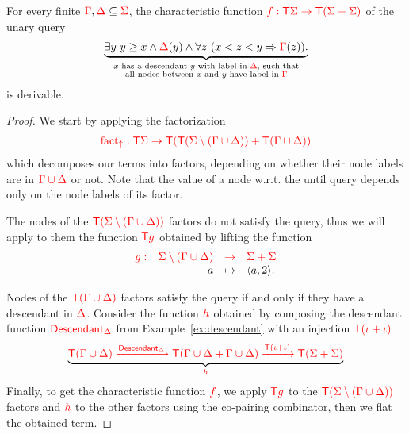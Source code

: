 \medskip
\begin{lemma}\label{lem:untilmod}
For every finite ${\color{red}{\Gamma}}, {\color{red}{\Delta}} \subseteq {\color{red}{\Sigma}}$,  the characteristic function ${\color{red}{f:{\color{red}{\mathsf T}}{\color{red}{\Sigma}}\to{\color{red}{\mathsf T}}({\color{red}{\Sigma}}+{\color{red}{\Sigma}})}}$ of the unary query
         \begin{align*}
              \underbrace{\exists y\ y \geq x \land {\color{red}{\Delta}}(y) \land  \forall z \ (x < z < y \Rightarrow {\color{red}{\Gamma}}(z)).}_{\substack{\text{$x$ has a descendant $y$ with label in ${\color{red}{\Delta}}$, such that}\\ \text{all nodes between $x$ and $y$ have label in ${\color{red}{\Gamma}}$}}} 
              \end{align*}
is derivable.
\end{lemma}
\begin{proof}
We start by applying the factorization
\begin{align*}
{\color{red}{{\color{red}{\mathrm{fact_{\uparrow}}}}: {\color{red}{\mathsf T}}\Sigma \to {\color{red}{\mathsf T}}({\color{red}{\mathsf T}}(\Sigma\setminus(\Gamma\cup\Delta)) +{\color{red}{\mathsf T}}(\Gamma\cup\Delta))}}
\end{align*}
which decomposes our terms into factors, depending on whether their node labels are in ${\color{red}{\Gamma\cup\Delta}}$ or not. 
Note that the value of a node w.r.t. the until query depends only on the node labels of its factor. %

The nodes of the ${\color{red}{{\color{red}{\mathsf T}}({\color{red}{\Sigma}}\setminus({\color{red}{\Gamma}}\cup{\color{red}{\Delta}}))}}$ factors do not satisfy the query, thus we will apply to them the function ${\color{red}{{\color{red}{\mathsf T}}g}}$ obtained by lifting the function 
$$\begin{array}{rrll}
 {\color{red}{g:}}& {\color{red}{{\color{red}{\Sigma}}\setminus({\color{red}{\Gamma}}\cup{\color{red}{\Delta}})}}& {\color{red}{\to}} &{\color{red}{{\color{red}{\Sigma}}+{\color{red}{\Sigma}}}}\\
&a&\mapsto& \langle{a,2}\rangle.
\end{array}$$
 
  
Nodes of the ${\color{red}{{\color{red}{\mathsf T}}(\Gamma\cup\Delta)}}$  factors satisfy the query if and only if they have a descendant in  ${\color{red}{\Delta}}$.
Consider the function ${\color{red}{h}}$ obtained by composing the descendant function ${\color{red}{\mathsf{Descendant}_\Delta}}$ from Example~\ref{ex:descendant} with an injection ${\color{red}{{\color{red}{\mathsf T}}(\iota+\iota)}}$
\begin{align*}
\underbrace{{\color{red}{{\color{red}{\mathsf T}}(\Gamma\cup\Delta) \xrightarrow{{\color{red}{\mathsf{Descendant}_\Delta}}} {\color{red}{\mathsf T}}(\Gamma\cup\Delta+\Gamma\cup\Delta) \xrightarrow{{\color{red}{{\color{red}{\mathsf T}}(\iota+\iota)}}}{\color{red}{\mathsf T}}(\Sigma+\Sigma)}}}_{{\color{red}{h}}}
\end{align*}
Finally, to get the characteristic function ${\color{red}{f}}$, we apply ${\color{red}{{\color{red}{\mathsf T}}{g}}}$ to the ${\color{red}{{\color{red}{\mathsf T}}(\Sigma\setminus(\Gamma\cup\Delta))}}$ factors and ${\color{red}{h}}$ to the other factors using the co-pairing combinator, then we flat the obtained term. 
\end{proof}


